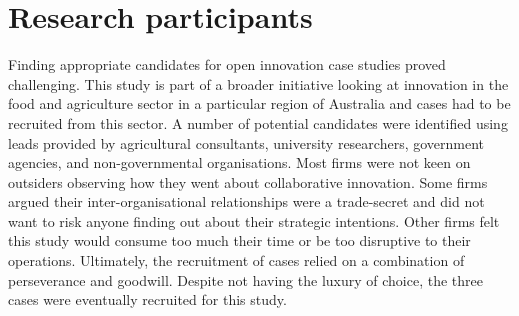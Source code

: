 \section{Research participants}

Finding appropriate candidates for open innovation case studies proved challenging. This study is part of a broader initiative looking at innovation in the food and agriculture sector in a particular region of Australia and cases had to be recruited from this sector. A number of potential candidates were identified using leads provided by agricultural consultants, university researchers, government agencies, and non-governmental organisations. Most firms were not keen on outsiders observing how they went about collaborative innovation. Some firms argued their inter-organisational relationships were a trade-secret and did not want to risk anyone finding out about their strategic intentions. Other firms felt this study would consume too much their time or be too disruptive to their operations. Ultimately, the recruitment of cases relied on a combination of perseverance and goodwill. Despite not having the luxury of choice, the three cases were eventually recruited for this study. \medskip

\begin{table}[]
	\small
	\centering
	\caption{Key characteristics of the cases recruited for this study}
	\label{cases}
\end{table}

